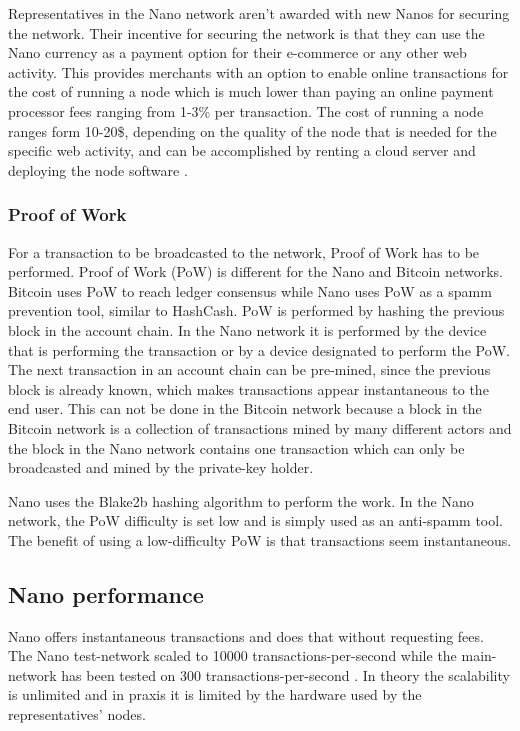 \documentclass{ferseminar}
\begin{document}
Representatives in the Nano network aren't awarded with new Nanos for securing the network. Their incentive for securing the network is that they can use the Nano currency as a payment option for their e-commerce or any other web activity. This provides merchants with an option to enable online transactions for the cost of running a node which is much lower than paying an online payment processor fees ranging from 1-3\% per transaction. The cost of running a node ranges form 10-20\$, depending on the quality of the node that is needed for the specific web activity, and can be accomplished by renting a cloud server and deploying the node software \cite{github}.

\subsubsection{Proof of Work}

For a transaction to be broadcasted to the network, Proof of Work has to be performed. Proof of Work (PoW) is different for the Nano and Bitcoin networks. Bitcoin uses PoW to reach ledger consensus while Nano uses PoW as a spamm prevention tool, similar to HashCash. PoW is performed by hashing the previous block in the account chain. In the Nano network it is performed by the device that is performing the transaction or by a device designated to perform the PoW. The next transaction in an account chain can be pre-mined, since the previous block is already known, which makes transactions appear instantaneous to the end user. This can not be done in the Bitcoin network because a block in the Bitcoin network is a collection of transactions mined by many different actors and the block in the Nano network contains one transaction which can only be broadcasted and mined by the private-key holder.

Nano uses the Blake2b hashing algorithm to perform the work. In the Nano network, the PoW difficulty is set low and is simply used as an anti-spamm tool. The benefit of using a low-difficulty PoW is that transactions seem instantaneous.


\subsection{Nano performance}
Nano offers instantaneous transactions and does that without requesting fees. The Nano test-network scaled to 10000 transactions-per-second while the main-network has been tested on 300 transactions-per-second \cite{Stress}. In theory the scalability is unlimited and in praxis it is limited by the hardware used by the representatives' nodes.
\end{document}
